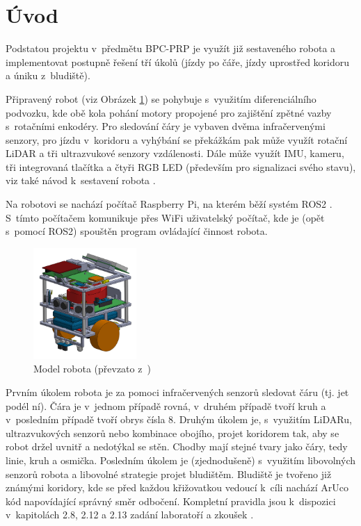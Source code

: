 \section{Úvod}

Podstatou projektu v~předmětu BPC-PRP je využít již sestaveného robota a implementovat postupně řešení tří úkolů (jízdy po čáře, jízdy uprostřed koridoru a úniku z~bludiště).

Připravený robot (viz Obrázek \ref{fig:robot_obr}) se pohybuje s~využitím diferenciálního podvozku, kde obě kola pohání motory propojené pro zajištění zpětné vazby s~rotačními enkodéry. Pro sledování čáry je vybaven dvěma infračervenými senzory, pro jízdu v~koridoru a vyhýbání se překážkám pak může využít rotační LiDAR a tři ultrazvukové senzory vzdálenosti. Dále může využít IMU, kameru, tři integrovaná tlačítka a čtyři RGB LED (především pro signalizaci svého stavu), viz také návod k~sestavení robota \cite{robot}.

Na robotovi se nachází počítač Raspberry Pi, na kterém běží systém ROS2 \cite{ros}. S~tímto počítačem komunikuje přes WiFi uživatelský počítač, kde je (opět s~pomocí ROS2) spouštěn program ovládající činnost robota. 

\begin{figure}[h]
    \centering
    \includegraphics[width=0.35\textwidth]{images/fenrir.png}
    \caption{Model robota (převzato z~\cite{prez1})}
    \label{fig:robot_obr}
\end{figure}

Prvním úkolem robota je za pomoci infračervených senzorů sledovat čáru (tj. jet podél ní). Čára je v~jednom případě rovná, v~druhém případě tvoří kruh a v~posledním případě tvoří obrys čísla 8. Druhým úkolem je, s~využitím LiDARu, ultrazvukových senzorů nebo kombinace obojího, projet koridorem tak, aby se robot držel uvnitř a nedotýkal se stěn. Chodby mají stejné tvary jako čáry, tedy linie, kruh a osmička. Posledním úkolem je (zjednodušeně) s~využitím libovolných senzorů robota a libovolné strategie projet bludištěm. Bludiště je tvořeno již známými koridory, kde se před každou křižovatkou vedoucí k~cíli nachází ArUco kód napovídající správný směr odbočení. Kompletní pravidla jsou k~dispozici v~kapitolách 2.8, 2.12 a 2.13 zadání laboratoří a zkoušek \cite{lab}.
